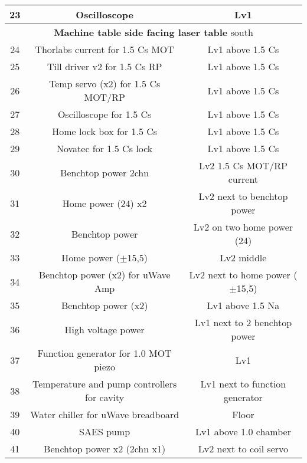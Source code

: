 \documentclass[10pt,fleqn,twocolumn]{article}
\begin{document}
\begin{longtable}{|c|c|c|}
  23&Oscilloscope&Lv1\\\hline
  \multicolumn{3}{|c|}{\textbf{Machine table side facing laser table} south}\\\hline
  24&Thorlabs current for 1.5 Cs MOT&Lv1 above 1.5 Cs\\\hline
  25&Till driver v2 for 1.5 Cs RP&Lv1 above 1.5 Cs\\\hline
  26&Temp servo (x2) for 1.5 Cs MOT/RP&Lv1 above 1.5 Cs\\\hline
  27&Oscilloscope for 1.5 Cs&Lv1 above 1.5 Cs\\\hline
  28&Home lock box for 1.5 Cs&Lv1 above 1.5 Cs\\\hline
  29&Novatec for 1.5 Cs lock&Lv1 above 1.5 Cs\\\hline
  30&Benchtop power 2chn&Lv2 1.5 Cs MOT/RP current\\\hline
  31&Home power (24) x2&Lv2 next to benchtop power\\\hline
  32&Benchtop power&Lv2 on two home power (24)\\\hline
  33&Home power ($\pm$15,5)&Lv2 middle\\\hline
  34&Benchtop power (x2) for uWave Amp&Lv2 next to home power ($\pm$15,5)\\\hline
  35&Benchtop power (x2)&Lv1 above 1.5 Na\\\hline
  36&High voltage power&Lv1 next to 2 benchtop power\\\hline
  37&Function generator for 1.0 MOT piezo&Lv1\\\hline
  38&Temperature and pump controllers for cavity&Lv1 next to function generator\\\hline
  39&Water chiller for uWave breadboard&Floor\\\hline
  40&SAES pump&Lv1 above 1.0 chamber\\\hline
  41&Benchtop power x2 (2chn x1)&Lv2 next to coil servo\\\hline
\end{longtable}
\twocolumn
\end{document}

